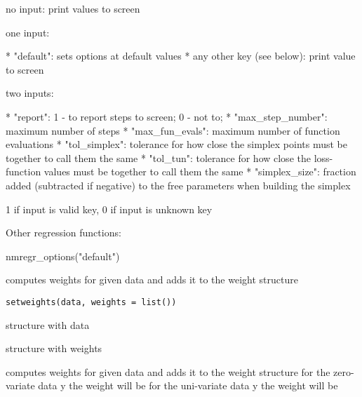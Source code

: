 \documentclass[a4paper]{book}
\begin{document}
\begin{Details}\relax
no input: print values to screen

one input:

* "default": sets options at default values
* any other key (see below): print value to screen

two inputs:

* "report": 1 - to report steps to screen; 0 - not to;
* "max\_step\_number": maximum number of steps
* "max\_fun\_evals": maximum number of function evaluations
* "tol\_simplex": tolerance for how close the simplex points must be together to call them the same
* "tol\_tun": tolerance for how close the loss-function values must be together to call them the same
* "simplex\_size": fraction added (subtracted if negative) to the free parameters when building the simplex
\end{Details}
%
\begin{Value}
1 if input is valid key, 0 if input is unknown key
\end{Value}
%
\begin{SeeAlso}\relax
Other regression functions: 
\end{SeeAlso}
%
\begin{Examples}
\begin{ExampleCode}
nmregr_options("default")
\end{ExampleCode}
\end{Examples}
%
\begin{Description}\relax
computes weights for given data and adds it to the weight structure
\end{Description}
%
\begin{Usage}
\begin{verbatim}
setweights(data, weights = list())
\end{verbatim}
\end{Usage}
%
\begin{Arguments}
\begin{ldescription}
\item[\code{data}] structure with data

\item[\code{weights}] structure with weights
\end{ldescription}
\end{Arguments}
%
\begin{Details}\relax
computes weights for given data and adds it to the weight structure
for the zero-variate data y the weight will be
for the uni-variate data y the weight will be
\end{Details}
\end{document}
